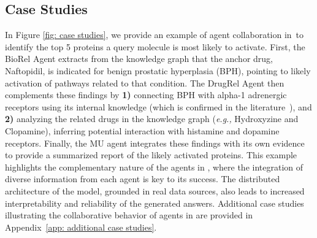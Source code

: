 \subsection{Case Studies}
In Figure \ref{fig: case studies}, we provide an example of agent collaboration in~\proposed to identify the top 5 proteins a query molecule is most likely to activate.
First, the BioRel Agent extracts from the knowledge graph that the anchor drug, Naftopidil, is indicated for benign prostatic hyperplasia (BPH), pointing to likely activation of pathways related to that condition. 
The DrugRel Agent then complements these findings by 
\textbf{1)} connecting BPH with alpha-1 adrenergic receptors using its internal knowledge (which is confirmed in the literature~\cite{klotsman2004case}), and 
\textbf{2)} analyzing the related drugs in the knowledge graph (\emph{e.g.,} Hydroxyzine and Clopamine), inferring potential interaction with histamine and dopamine receptors. 
Finally, the MU agent integrates these findings with its own evidence to provide a summarized report of the likely activated proteins. 
This example highlights the complementary nature of the agents in \proposed, where the integration of diverse information from each agent is key to its success. 
The distributed architecture of the model, grounded in real data sources, also leads to increased interpretability and reliability of the generated answers.
Additional case studies illustrating the collaborative behavior of agents in \proposed are provided in Appendix~\ref{app: additional case studies}.

